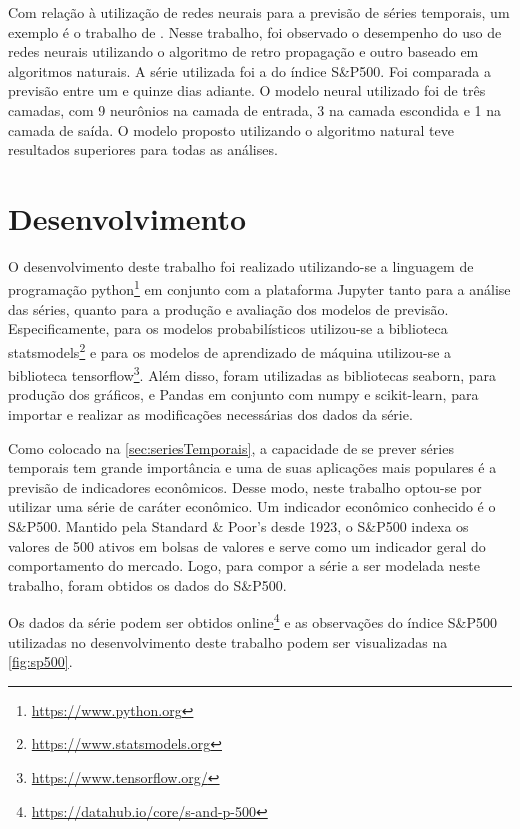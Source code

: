 \documentclass[
    12pt,
    oneside,
    a4paper,
    english,
    brazil
]{abntex2}
\begin{document}
Com relação à  utilização  de  redes   neurais para a previsão de séries temporais, um exemplo é o trabalho de .
Nesse  trabalho, foi  observado o  desempenho do  uso de
redes neurais  utilizando o algoritmo de  retro propagação e outro  baseado em
algoritmos naturais. A série utilizada foi a do índice S\&P500. Foi comparada
a previsão  entre um e  quinze dias adiante. O  modelo neural utilizado  foi de
três camadas, com 9  neurônios na camada de entrada, 3 na  camada escondida e 1
na camada de saída.  O modelo proposto utilizando o algoritmo  natural teve resultados
superiores para todas as análises.

\chapter{Desenvolvimento}\label{chap:desenv}

O desenvolvimento deste trabalho foi realizado utilizando-se a linguagem  de
programação  python\footnote{\url{https://www.python.org}}  em   conjunto  com a plataforma Jupyter  tanto para  a  análise  das séries,  quanto para a produção e avaliação  dos  modelos de previsão.
Especificamente,   para    os   modelos   probabilísticos    utilizou-se
a    biblioteca   statsmodels\footnote{\url{https://www.statsmodels.org}} e para  os modelos  de aprendizado de  máquina utilizou-se a biblioteca tensorflow\footnote{\url{https://www.tensorflow.org/}}. Além disso,  foram utilizadas as  bibliotecas seaborn, para produção dos gráficos, e Pandas em conjunto com numpy e scikit-learn, para
importar e realizar as modificações necessárias dos dados da série.

Como  colocado  na \autoref{sec:seriesTemporais},  a  capacidade  de se  prever
séries temporais tem grande importância e uma de suas aplicações mais populares
é a  previsão de  indicadores  econômicos. Desse modo, neste trabalho optou-se por utilizar uma série de caráter econômico.
Um indicador econômico conhecido é o S\&P500. Mantido  pela Standard \&  Poor's desde 1923, o S\&P500 indexa os valores de 500 ativos em  bolsas de valores e  serve como  um indicador  geral do  comportamento do  mercado. 
Logo, para compor a série a ser modelada neste trabalho, foram  obtidos os dados do S\&P500.

Os           dados            da           série            podem           ser
obtidos      online\footnote{\url{https://datahub.io/core/s-and-p-500}} e as observações do índice  S\&P500 utilizadas no desenvolvimento deste trabalho podem ser visualizadas na
\autoref{fig:sp500}.
\end{document}
